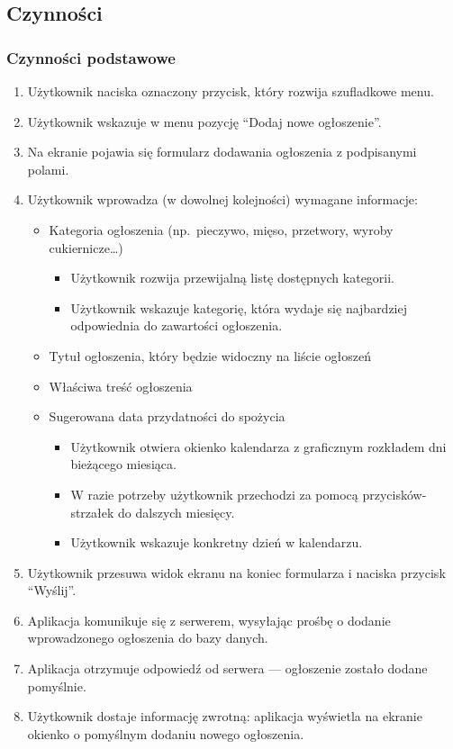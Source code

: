 \documentclass[12pt,a4paper,twoside]{article}
\begin{document}
    
    \subsection{Czynności}
    
    
    \subsubsection{Czynności podstawowe}
    
    
    \begin{enumerate}
        \item Użytkownik naciska oznaczony przycisk, który rozwija szufladkowe menu.
        \item Użytkownik wskazuje w menu pozycję ``Dodaj nowe ogłoszenie''.
        \item Na ekranie pojawia się formularz dodawania ogłoszenia z podpisanymi polami.
        \item Użytkownik wprowadza (w dowolnej kolejności) wymagane informacje:
        \begin{itemize}
            \item Kategoria ogłoszenia (np.\ pieczywo, mięso, przetwory, wyroby cukiernicze\ldots)
            \begin{itemize}
                \item Użytkownik rozwija przewijalną listę dostępnych kategorii.
                \item Użytkownik wskazuje kategorię, która wydaje się najbardziej odpowiednia do zawartości ogłoszenia.
            \end{itemize}
            \item Tytuł ogłoszenia, który będzie widoczny na liście ogłoszeń
            \item Właściwa treść ogłoszenia
            \item Sugerowana data przydatności do spożycia
            \begin{itemize}
                \item Użytkownik otwiera okienko kalendarza z graficznym rozkładem dni bieżącego miesiąca.
                \item W razie potrzeby użytkownik przechodzi za pomocą przycisków-strzałek do dalszych miesięcy.
                \item Użytkownik wskazuje konkretny dzień w kalendarzu.
            \end{itemize}
        \end{itemize}
        \item Użytkownik przesuwa widok ekranu na koniec formularza i naciska przycisk ``Wyślij''.
        \item Aplikacja komunikuje się z serwerem, wysyłając prośbę o dodanie wprowadzonego ogłoszenia do bazy danych.
        \item Aplikacja otrzymuje odpowiedź od serwera --- ogłoszenie zostało dodane pomyślnie.
        \item Użytkownik dostaje informację zwrotną: aplikacja wyświetla na ekranie okienko o pomyślnym dodaniu nowego ogłoszenia.
    \end{enumerate}
    
\end{document}
